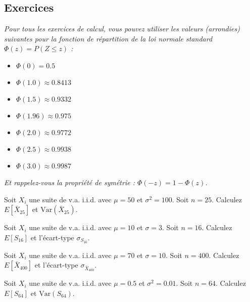 \subsection{Exercices}

\textit{Pour tous les exercices de calcul, vous pouvez utiliser les valeurs (arrondies) suivantes pour la fonction de répartition de la loi normale standard $\Phi(z) = P(Z \le z)$ :}
\begin{itemize}
    \item $\Phi(0) = 0.5$
    \item $\Phi(1.0) \approx 0.8413$
    \item $\Phi(1.5) \approx 0.9332$
    \item $\Phi(1.96) \approx 0.975$
    \item $\Phi(2.0) \approx 0.9772$
    \item $\Phi(2.5) \approx 0.9938$
    \item $\Phi(3.0) \approx 0.9987$
\end{itemize}
\textit{Et rappelez-vous la propriété de symétrie : $\Phi(-z) = 1 - \Phi(z)$.}


\begin{exercicebox}
Soit $X_i$ une suite de v.a. i.i.d. avec $\mu=50$ et $\sigma^2=100$. Soit $n=25$.
Calculez $E[\bar{X}_{25}]$ et $\text{Var}(\bar{X}_{25})$.
\end{exercicebox}

\begin{exercicebox}
Soit $X_i$ une suite de v.a. i.i.d. avec $\mu=10$ et $\sigma=3$. Soit $n=16$.
Calculez $E[S_{16}]$ et l'écart-type $\sigma_{S_{16}}$.
\end{exercicebox}

\begin{exercicebox}
Soit $X_i$ une suite de v.a. i.i.d. avec $\mu=70$ et $\sigma=10$. Soit $n=400$.
Calculez $E[\bar{X}_{400}]$ et l'écart-type $\sigma_{\bar{X}_{400}}$.
\end{exercicebox}

\begin{exercicebox}
Soit $X_i$ une suite de v.a. i.i.d. avec $\mu=0.5$ et $\sigma^2=0.01$. Soit $n=64$.
Calculez $E[S_{64}]$ et $\text{Var}(S_{64})$.
\end{exercicebox}

